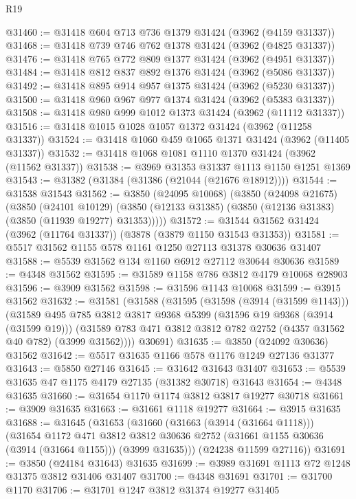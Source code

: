 \begin{lexlean}{R19}
\begin{coremodule}
@31460 := @31418 @604 @713 @736 @1379 @31424 (@3962 (@4159 @31337))
@31468 := @31418 @739 @746 @762 @1378 @31424 (@3962 (@4825 @31337))
@31476 := @31418 @765 @772 @809 @1377 @31424 (@3962 (@4951 @31337))
@31484 := @31418 @812 @837 @892 @1376 @31424 (@3962 (@5086 @31337))
@31492 := @31418 @895 @914 @957 @1375 @31424 (@3962 (@5230 @31337))
@31500 := @31418 @960 @967 @977 @1374 @31424 (@3962 (@5383 @31337))
@31508 := @31418 @980 @999 @1012 @1373 @31424 (@3962 (@11112 @31337))
@31516 := @31418 @1015 @1028 @1057 @1372 @31424 (@3962 (@11258 @31337))
@31524 := @31418 @1060 @459 @1065 @1371 @31424 (@3962 (@11405 @31337))
@31532 := @31418 @1068 @1081 @1110 @1370 @31424 (@3962 (@11562 @31337))
@31538 := @3969 @31353 @31337 @1113 @1150 @1251 @1369
@31543 := @31382 (@31384 (@31386 (@21044 (@21676 @18912))))
@31544 := @31538 @31543
@31562 := @3850
    (@24095 @10068)
    (@3850
      (@24098 @21675)
      (@3850
        (@24101 @10129)
        (@3850 (@12133 @31385) (@3850 (@12136 @31383) (@3850 (@11939 @19277) @31353)))))
@31572 := @31544 @31562 @31424 (@3962 (@11764 @31337)) (@3878 (@3879 @1150 @31543 @31353))
@31581 := @5517 @31562 @1155 @578 @1161 @1250 @27113 @31378 @30636 @31407
@31588 := @5539 @31562 @134 @1160 @6912 @27112 @30644 @30636
@31589 := @4348 @31562
@31595 := @31589 @1158 @786 @3812 @4179 @10068 @28903
@31596 := @3909 @31562
@31598 := @31596 @1143 @10068
@31599 := @3915 @31562
@31632 := @31581
    (@31588
      (@31595
        (@31598 (@3914 (@31599 @1143)))
        (@31589
          @495
          @785
          @3812
          @3817
          @9368
          @5399
          (@31596 @19 @9368 (@3914 (@31599 @19)))
          (@31589 @783 @471 @3812 @3812 @782 @2752 (@4357 @31562 @40 @782) (@3999 @31562))))
      @30691)
@31635 := @3850 (@24092 @30636) @31562
@31642 := @5517 @31635 @1166 @578 @1176 @1249 @27136 @31377
@31643 := @5850 @27146
@31645 := @31642 @31643 @31407
@31653 := @5539 @31635 @47 @1175 @4179 @27135 (@31382 @30718) @31643
@31654 := @4348 @31635
@31660 := @31654 @1170 @1174 @3812 @3817 @19277 @30718
@31661 := @3909 @31635
@31663 := @31661 @1118 @19277
@31664 := @3915 @31635
@31688 := @31645
    (@31653
      (@31660
        (@31663 (@3914 (@31664 @1118)))
        (@31654
          @1172
          @471
          @3812
          @3812
          @30636
          @2752
          (@31661 @1155 @30636 (@3914 (@31664 @1155)))
          (@3999 @31635)))
      (@24238 @11599 @27116))
@31691 := @3850 (@24184 @31643) @31635
@31699 := @3989 @31691 @1113 @72 @1248 @31375 @3812 @31406 @31407
@31700 := @4348 @31691
@31701 := @31700 @1170
@31706 := @31701 @1247 @3812 @31374 @19277 @31405

\end{coremodule}
\end{lexlean}
